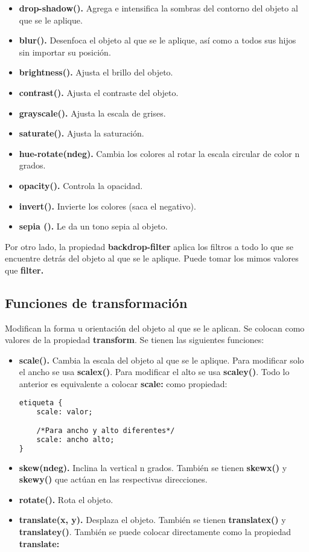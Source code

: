 \documentclass[10pt,oneside]{article}
\begin{document}
\begin{multicols}{2}
    \begin{itemize}
        \item \textbf{drop-shadow().} Agrega e intensifica la sombras del contorno del objeto al que se le aplique.
        \item \textbf {blur().} Desenfoca el objeto al que se le aplique, así como a todos sus hijos sin importar su posición.  
        \item \textbf{brightness().} Ajusta el brillo del objeto.
        \item \textbf{contrast().} Ajusta el contraste del objeto.
        \item \textbf{grayscale().} Ajusta la escala de grises.
        \item \textbf{saturate().} Ajusta la saturación.
        \item \textbf{hue-rotate(ndeg).} Cambia los colores al rotar la escala circular de color n grados. 
        \item \textbf{opacity().} Controla la opacidad.
        \item \textbf{invert().} Invierte los colores (saca el negativo).
        \item \textbf{sepia ().} Le da un tono sepia al objeto.
    \end{itemize}

    Por otro lado, la propiedad \textbf{backdrop-filter} aplica los filtros a todo lo que se encuentre detrás del objeto al que se le aplique. Puede tomar los mimos valores que \textbf{filter.}

\subsection{Funciones de transformación}

    Modifican la forma u orientación del objeto al que se le aplican. Se colocan como valores de la propiedad \textbf{transform}. Se tienen las siguientes funciones:

    \begin{itemize}
        \item \textbf{scale().} Cambia la escala del objeto al que se le aplique. Para modificar solo el ancho se usa \textbf{scalex()}. Para modificar el alto se usa \textbf{scaley()}. Todo lo anterior es equivalente a colocar \textbf{scale:} como propiedad:

        \begin{lstlisting}[language=HTML]
etiqueta {
    scale: valor;

    /*Para ancho y alto diferentes*/
    scale: ancho alto;
}
        \end{lstlisting}
        \item \textbf{skew(ndeg).} Inclina la vertical n grados. También se tienen \textbf{skewx()} y \textbf{skewy()} que actúan en las respectivas direcciones. 
        \item \textbf{rotate().} Rota el objeto.
        \item \textbf{translate(x, y).} Desplaza el objeto. También se tienen \textbf{translatex()} y \textbf{translatey()}. También se puede colocar directamente como la propiedad \textbf{translate:}
    \end{itemize}


\end{multicols}
\end{document}
